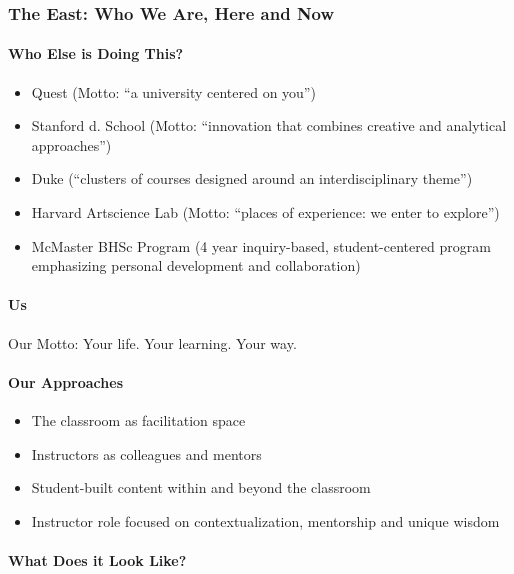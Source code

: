 \documentclass[letterpaper,10pt,headsepline]{scrreprt}
\begin{document}
\subsubsection{The East: Who We Are, Here and Now}

\paragraph{Who Else is Doing This?}

\begin{itemize}
\itemsep1pt\parskip0pt
\item
  Quest (Motto: ``a university centered on you'')
\item
  Stanford d. School (Motto: ``innovation that combines creative and
  analytical approaches'')
\item
  Duke (``clusters of courses designed around an interdisciplinary
  theme'')
\item
  Harvard Artscience Lab (Motto: ``places of experience: we enter to
  explore'')
\item
  McMaster BHSc Program (4 year inquiry-based, student-centered program
  emphasizing personal development and collaboration)
\end{itemize}

\paragraph{Us}

Our Motto: Your life. Your learning. Your way.

\paragraph{Our Approaches}

\begin{itemize}
\itemsep1pt\parskip0pt
\item
  The classroom as facilitation space
\item
  Instructors as colleagues and mentors
\item
  Student-built content within and beyond the classroom
\item
  Instructor role focused on contextualization, mentorship and unique
  wisdom
\end{itemize}

\paragraph{What Does it Look Like?}
\end{document}
